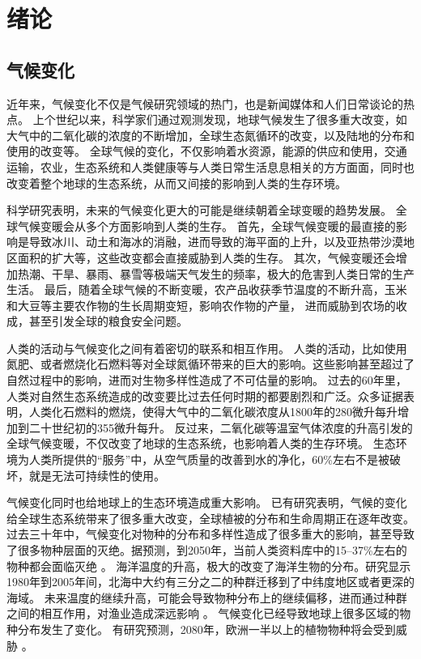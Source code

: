 \chapter{绪论}
\label{cha:intro}

\section{气候变化}

近年来，气候变化不仅是气候研究领域的热门，也是新闻媒体和人们日常谈论的热点。
上个世纪以来，科学家们通过观测发现，地球气候发生了很多重大改变，如大气中的二氧化碳的浓度的不断增加，全球生态氮循环的改变，以及陆地的分布和使用的改变等\cite{vitousek1994beyond}。
全球气候的变化，不仅影响着水资源，能源的供应和使用，交通运输，农业，生态系统和人类健康等与人类日常生活息息相关的方方面面\cite{karl2009global}，同时也改变着整个地球的生态系统，从而又间接的影响到人类的生存环境。



科学研究表明，未来的气候变化更大的可能是继续朝着全球变暖的趋势发展\cite{solomon2007climate,stocker2013ipcc}。
全球气候变暖会从多个方面影响到人类的生存。
首先，全球气候变暖的最直接的影响是导致冰川、动土和海冰的消融，进而导致的海平面的上升，以及亚热带沙漠地区面积的扩大等，这些改变都会直接威胁到人类的生存\cite{stocker2013ipcc}。
其次，气候变暖还会增加热潮、干旱、暴雨、暴雪等极端天气发生的频率，极大的危害到人类日常的生产生活\cite{solomon2007climate}。
最后，随着全球气候的不断变暖，农产品收获季节温度的不断升高，玉米和大豆等主要农作物的生长周期变短，影响农作物的产量， 进而威胁到农场的收成，甚至引发全球的粮食安全问题\cite{battisti2009historical,adams1990global,smith1989potential}。 

人类的活动与气候变化之间有着密切的联系和相互作用。
人类的活动，比如使用氮肥、或者燃烧化石燃料等对全球氮循环带来的巨大的影响。这些影响甚至超过了自然过程中的影响，进而对生物多样性造成了不可估量的影响。
过去的60年里，人类对自然生态系统造成的改变要比过去任何时期的都要剧烈和广泛。众多证据表明，人类化石燃料的燃烧，使得大气中的二氧化碳浓度从1800年的280微升每升增加到二十世纪初的355微升每升\cite{vitousek1994beyond}。
反过来，二氧化碳等温室气体浓度的升高引发的全球气候变暖，不仅改变了地球的生态系统，也影响着人类的生存环境。
生态环境为人类所提供的“服务”中，从空气质量的改善到水的净化，60\%左右不是被破坏，就是无法可持续性的使用\cite{assessment2005ecosystems}。



气候变化同时也给地球上的生态环境造成重大影响。
已有研究表明，气候的变化给全球生态系统带来了很多重大改变，全球植被的分布和生命周期正在逐年改变\cite{parmesan2003globally}。
过去三十年中，气候变化对物种的分布和多样性造成了很多重大的影响，甚至导致了很多物种层面的灭绝。据预测，到2050年，当前人类资料库中的15–37\%左右的物种都会面临灭绝 \cite{thomas2004extinction} 。
海洋温度的升高，极大的改变了海洋生物的分布。研究显示1980年到2005年间，北海中大约有三分之二的种群迁移到了中纬度地区或者更深的海域。
未来温度的继续升高，可能会导致物种分布上的继续偏移，进而通过种群之间的相互作用，对渔业造成深远影响\cite{perry2005climate} 。
气候变化已经导致地球上很多区域的物种分布发生了变化。 
有研究预测，2080年，欧洲一半以上的植物物种将会受到威胁\cite{thuiller2005climate} 。

